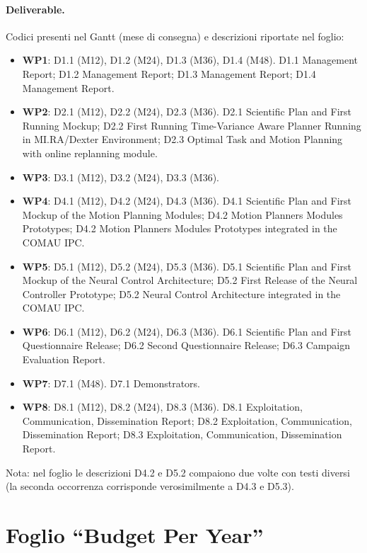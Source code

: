 \documentclass{plan4ari_report}
\begin{document}
\paragraph{Deliverable.} Codici presenti nel Gantt (mese di consegna) e descrizioni riportate nel foglio:
\begin{itemize}\setlength{\itemsep}{0pt}
\item \textbf{WP1}: D1.1 (M12), D1.2 (M24), D1.3 (M36), D1.4 (M48). D1.1 Management Report; D1.2 Management Report; D1.3 Management Report; D1.4 Management Report.
\item \textbf{WP2}: D2.1 (M12), D2.2 (M24), D2.3 (M36). D2.1 Scientific Plan and First Running Mockup; D2.2 First Running Time-Variance Aware Planner Running in MI.RA/Dexter Environment; D2.3 Optimal Task and Motion Planning with online replanning module.
\item \textbf{WP3}: D3.1 (M12), D3.2 (M24), D3.3 (M36).
\item \textbf{WP4}: D4.1 (M12), D4.2 (M24), D4.3 (M36). D4.1 Scientific Plan and First Mockup of the Motion Planning Modules; D4.2 Motion Planners Modules Prototypes; D4.2 Motion Planners Modules Prototypes integrated in the COMAU IPC.
\item \textbf{WP5}: D5.1 (M12), D5.2 (M24), D5.3 (M36). D5.1 Scientific Plan and First Mockup of the Neural Control Architecture; D5.2 First Release of the Neural Controller Prototype; D5.2 Neural Control Architecture integrated in the COMAU IPC.
\item \textbf{WP6}: D6.1 (M12), D6.2 (M24), D6.3 (M36). D6.1 Scientific Plan and First Questionnaire Release; D6.2 Second Questionnaire Release; D6.3 Campaign Evaluation Report.
\item \textbf{WP7}: D7.1 (M48). D7.1 Demonstrators.
\item \textbf{WP8}: D8.1 (M12), D8.2 (M24), D8.3 (M36). D8.1 Exploitation, Communication, Dissemination Report; D8.2 Exploitation, Communication, Dissemination Report; D8.3 Exploitation, Communication, Dissemination Report.
\end{itemize}
Nota: nel foglio le descrizioni D4.2 e D5.2 compaiono due volte con testi diversi (la seconda occorrenza corrisponde verosimilmente a D4.3 e D5.3).

\section{Foglio ``Budget Per Year''}
\end{document}
